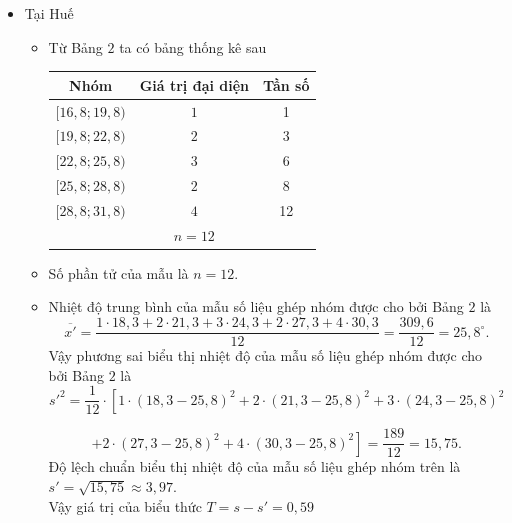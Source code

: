 \begin{bt}
{\begin{itemize}
\begin{itemize}
				\[\left.+1\cdot (27{,}3-24{,}8)^2+4\cdot (30{,}3-24{,}8)^2 \right]=\dfrac{249}{12}=20{,}75.
				\]
				Độ lệch chuẩn biểu thị nhiệt độ của mẫu số liệu ghép nhóm trên là $s=\sqrt{20{,}75} \approx 4{,}56$.
			\end{itemize}
			\item Tại Huế
			\begin{itemize}
				\item Từ Bảng $2$ ta có bảng thống kê sau
				\begin{center}
					\begin{tabular}{|c|c|c|}
						\hline
						Nhóm & Giá trị đại diện & Tần số \\
						\hline
						$[16{,}8; 19{,}8)$ & $1$ & 1 \\
						{$[19{,}8; 22{,}8)$} & $2$ & 3 \\
						{$[22{,}8; 25{,}8)$} & $3$ & 6 \\
						{$[25{,}8; 28{,}8)$} & $2$ & 8 \\
						{$[28{,}8; 31{,}8)$} & $4$ & 12 \\
						\hline
						& $n=12$& \\
						\hline
					\end{tabular}
				\end{center}
				\item Số phần tử của mẫu là $n=12$.
				\item Nhiệt độ trung bình của mẫu số liệu ghép nhóm được cho bởi Bảng $2$ là
				\[\overline{x'}=\dfrac{1\cdot 18{,}3+2\cdot 21{,}3+3\cdot 24{,}3+2\cdot 27{,}3+4\cdot 30{,}3}{12}=\dfrac{309{,}6}{12}=25{,}8^\circ.
				\]
				Vậy phương sai biểu thị nhiệt độ của mẫu số liệu ghép nhóm được cho bởi Bảng $2$ là
				\[s'^2=\dfrac{1}{12} \cdot \left[1\cdot (18{,}3-25{,}8)^2+2\cdot (21{,}3-25{,}8)^2+3\cdot (24{,}3-25{,}8)^2 \right.
				\]
				
				\[\left.+2\cdot (27{,}3-25{,}8)^2+4\cdot (30{,}3-25{,}8)^2 \right]=\dfrac{189}{12}=15{,}75.
				\]
				Độ lệch chuẩn biểu thị nhiệt độ của mẫu số liệu ghép nhóm trên là $s'=\sqrt{15{,}75} \approx 3{,}97$.\\
				Vậy giá trị của biểu thức $T=s-s'=0{,}59$
			\end{itemize}
		\end{itemize}
		
	}
\end{bt}

